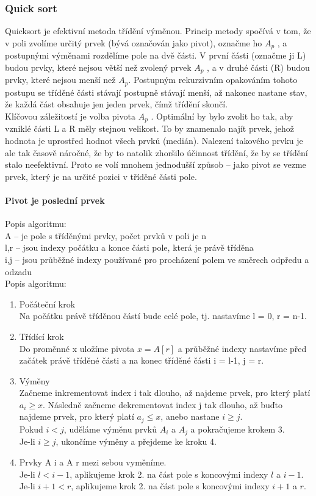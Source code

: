 \documentclass[10pt,a4paper]{article}
\begin{document}
\subsubsection{Quick sort}
Quicksort je efektivní metoda třídění výměnou. Princip metody spočívá v tom, že v poli zvolíme určitý prvek (bývá označován jako pivot), označme ho $A_p$ , a postupnými výměnami rozdělíme pole na dvě části. V první části (označme ji L) budou prvky, které nejsou větší než zvolený prvek $A_p$ , a v druhé části (R) budou prvky, které nejsou menší než $A_p$. Postupným rekurzivním opakováním tohoto postupu se tříděné části stávají postupně stávají menší, až nakonec nastane stav, že každá část obsahuje jen jeden prvek, čímž třídění skončí. \\
Klíčovou záležitostí je volba pivota $A_p$ . Optimální by bylo zvolit ho tak, aby vzniklé části L a R měly stejnou velikost. To by znamenalo najít prvek, jehož hodnota je uprostřed hodnot všech prvků (medián). Nalezení takového prvku je ale tak časově náročné, že by to natolik zhoršilo účinnost třídění, že by se třídění stalo neefektivní. Proto se volí mnohem jednodušší způsob – jako pivot se vezme prvek, který je na určité pozici v tříděné části pole.
\paragraph{Pivot je poslední prvek} Popis algoritmu: \\
A – je pole s tříděnými prvky, počet prvků v poli je n \\
l,r – jsou indexy počátku a konce části pole, která je právě tříděna \\
i,j – jsou průběžné indexy používané pro procházení polem ve směrech odpředu a odzadu \\
Popis algoritmu:
\begin{enumerate}
	\item Počáteční krok \\
	Na počátku právě tříděnou částí bude celé pole, tj. nastavíme l = 0, r = n-1.
	\item Třídící krok \\
	Do proměnné x uložíme pivota $x = A[r]$ a průběžné indexy nastavíme před začátek právě tříděné části a na konec tříděné části i = l-1, j = r.
	\item Výměny \\
	Začneme inkrementovat index i tak dlouho, až najdeme prvek, pro který platí $a_i \geq x$. Následně začneme dekrementovat index j tak dlouho, až buďto najdeme prvek, pro který platí $a_j \leq x$, anebo nastane $i \geq j$. \\
	Pokud $i < j$, uděláme výměnu prvků $A_i$ a $A_j$ a pokračujeme krokem 3. \\
	Je-li $i \geq j$, ukončíme výměny a přejdeme ke kroku 4.
	\item Prvky A i a A r mezi sebou vyměníme. \\
	Je-li $ l < i-1 $, aplikujeme krok 2. na část pole s koncovými indexy $l$ a $i-1$. \\
	Je-li $ i+1 < r $, aplikujeme krok 2. na část pole s koncovými indexy $i+1$ a $r$.
\end{enumerate}
\end{document}
